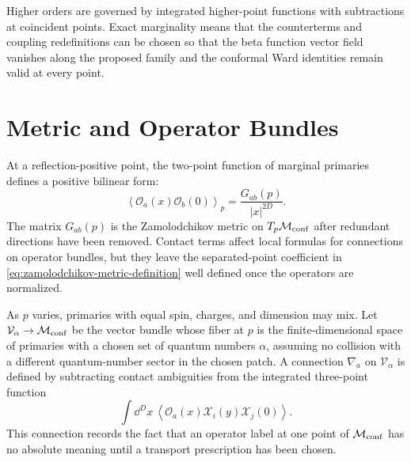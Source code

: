 Higher orders are governed by integrated higher-point functions with
subtractions at coincident points.  Exact marginality means that the
counterterms and coupling redefinitions can be chosen so that the beta
function vector field vanishes along the proposed family and the conformal
Ward identities remain valid at every point.

\section{Metric and Operator Bundles}

At a reflection-positive point, the two-point function of marginal primaries
defines a positive bilinear form:
\begin{equation}
  \left\langle\mathcal O_a(x)\mathcal O_b(0)\right\rangle_p
  =
  \frac{G_{ab}(p)}{|x|^{2D}}.
  \label{eq:zamolodchikov-metric-definition}
\end{equation}
The matrix \(G_{ab}(p)\) is the Zamolodchikov metric on
\(T_p\mathcal M_{\rm conf}\) after redundant directions have been removed.
Contact terms affect local formulas for connections on operator bundles, but
they leave the separated-point coefficient in
\eqref{eq:zamolodchikov-metric-definition} well defined once the operators
are normalized.

As \(p\) varies, primaries with equal spin, charges, and dimension may mix.
Let \(\mathcal V_{\alpha}\to\mathcal M_{\rm conf}\) be the vector bundle
whose fiber at \(p\) is the finite-dimensional space of primaries with a
chosen set of quantum numbers \(\alpha\), assuming no collision with a
different quantum-number sector in the chosen patch.  A connection
\(\nabla_a\) on \(\mathcal V_\alpha\) is defined by subtracting contact
ambiguities from the integrated three-point function
\[
  \int\dd^Dx\,
  \left\langle
    \mathcal O_a(x)\mathcal X_i(y)\mathcal X_j(0)
  \right\rangle .
\]
This connection records the fact that an operator label at one point of
\(\mathcal M_{\rm conf}\) has no absolute meaning until a transport
prescription has been chosen.

